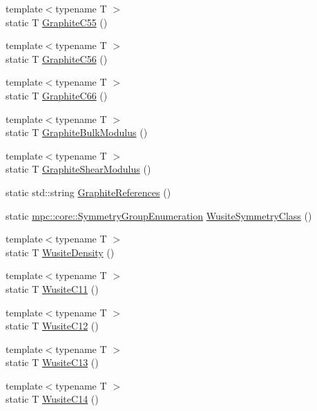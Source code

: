 \begin{DoxyCompactItemize}
\item 
{\footnotesize template$<$typename T $>$ }\\static T \mbox{\hyperlink{namespacempc_1_1data_a7fbd88b9198cf5794ab5d3a8d2627595}{Graphite\+C55}} ()
\item 
{\footnotesize template$<$typename T $>$ }\\static T \mbox{\hyperlink{namespacempc_1_1data_ade41aa92d29cc38b604c6981e5639ff9}{Graphite\+C56}} ()
\item 
{\footnotesize template$<$typename T $>$ }\\static T \mbox{\hyperlink{namespacempc_1_1data_a74e2b98f265fc9facd0c9c23074e4dc0}{Graphite\+C66}} ()
\item 
{\footnotesize template$<$typename T $>$ }\\static T \mbox{\hyperlink{namespacempc_1_1data_a8d3fe38b39965b0531fca845efc473a1}{Graphite\+Bulk\+Modulus}} ()
\item 
{\footnotesize template$<$typename T $>$ }\\static T \mbox{\hyperlink{namespacempc_1_1data_ab32f0b0209b9e16fd06431929a2721b0}{Graphite\+Shear\+Modulus}} ()
\item 
static std\+::string \mbox{\hyperlink{namespacempc_1_1data_a44eb9375e7b636aa2f7aa6e5d5bc16c1}{Graphite\+References}} ()
\item 
static \mbox{\hyperlink{namespacempc_1_1core_a9d979684062547055a0ef5c13077bad8}{mpc\+::core\+::\+Symmetry\+Group\+Enumeration}} \mbox{\hyperlink{namespacempc_1_1data_a995cce064e4e6d2f7870e35d41f467b1}{Wusite\+Symmetry\+Class}} ()
\item 
{\footnotesize template$<$typename T $>$ }\\static T \mbox{\hyperlink{namespacempc_1_1data_ae5d0022de35d082c6cee2da5c2d17e35}{Wusite\+Density}} ()
\item 
{\footnotesize template$<$typename T $>$ }\\static T \mbox{\hyperlink{namespacempc_1_1data_a235e10ed6f7c6d5e7618f31f33e7c434}{Wusite\+C11}} ()
\item 
{\footnotesize template$<$typename T $>$ }\\static T \mbox{\hyperlink{namespacempc_1_1data_a94ee74c59aa69c77f06430cded8f76dc}{Wusite\+C12}} ()
\item 
{\footnotesize template$<$typename T $>$ }\\static T \mbox{\hyperlink{namespacempc_1_1data_a638ce65e87b41c510edc5ebf725d0ad7}{Wusite\+C13}} ()
\item 
{\footnotesize template$<$typename T $>$ }\\static T \mbox{\hyperlink{namespacempc_1_1data_a32420a5c752c50834b79c3c944e018e7}{Wusite\+C14}} ()

\end{DoxyCompactItemize}

